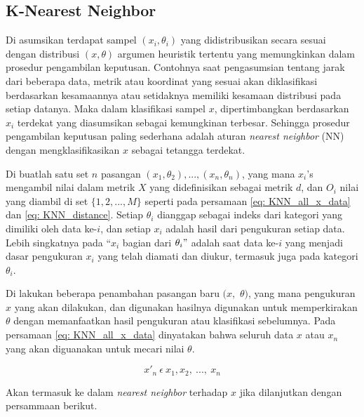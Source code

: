\subsection{K-Nearest Neighbor}
\label{sec:sub_sec2_knn}
\vspace{1ex}

Di asumsikan terdapat sampel $(x_{i}, \theta_{i})$ yang didistribusikan secara sesuai dengan distribusi $(x, \theta)$ argumen heuristik tertentu yang memungkinkan dalam prosedur pengambilan keputusan. Contohnya saat pengasumsian tentang jarak dari beberapa data, metrik atau koordinat yang sesuai akan diklasifikasi berdasarkan kesamaannya atau setidaknya memiliki kesamaan distribusi pada setiap datanya. Maka dalam klasifikasi sampel $x$, dipertimbangkan berdasarkan $x_{i}$ terdekat yang diasumsikan sebagai kemungkinan terbesar. Sehingga prosedur pengambilan keputusan paling sederhana adalah aturan \textit{nearest neighbor} (NN) dengan mengklasifikasikan $x$ sebagai tetangga terdekat.
\vspace{1ex}

Di buatlah satu set $n$ pasangan $(x_{1}, \theta_{2}), ..., (x_{n}, \theta_{n})$, yang mana $x_{i}$'s mengambil nilai dalam metrik $X$ yang didefinisikan sebagai metrik $d$, dan $O_{i}$ nilai yang diambil di set $\{1, 2, ..., M\}$ seperti pada persamaan \ref{eq: KNN_all_x_data} dan \ref{eq: KNN_distance}. Setiap $\theta_{i}$ dianggap sebagai indeks dari kategori yang dimiliki oleh data ke-$i$, dan setiap $x_{i}$ adalah hasil dari pengukuran setiap data. Lebih singkatnya pada ``$x_{i}$ bagian dari $\theta_{i}"$ adalah saat data ke-$i$ yang menjadi dasar pengukuran $x_{i}$ yang telah diamati dan diukur, termasuk juga pada kategori $\theta_{i}$.
\vspace{1ex}

Di lakukan beberapa penambahan pasangan baru $(x,$ $\theta)$, yang mana pengukuran $x$ yang akan dilakukan, dan digunakan hasilnya digunakan untuk memperkirakan $\theta$ dengan memanfaatkan hasil pengukuran atau klasifikasi sebelumnya. Pada persamaan \ref{eq: KNN_all_x_data} dinyatakan bahwa seluruh data $x$ atau $x_{n}$ yang akan diguanakan untuk mecari nilai $\theta$.

\begin{equation}\label{eq: KNN_all_x_data}
x'_{n}\ \epsilon\ x_{1}, x_{2},\ ...,\ x_{n}
\end{equation}

\noindent Akan termasuk ke dalam \textit{nearest neighbor} terhadap $x$ jika dilanjutkan dengan persammaan berikut.

